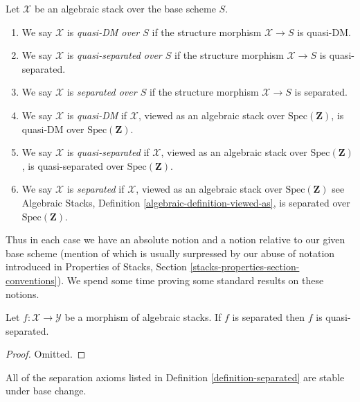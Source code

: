 \begin{definition}
\label{definition-absolute-separated}
Let $\mathcal{X}$ be an algebraic stack over the base scheme $S$.
\begin{enumerate}
\item We say $\mathcal{X}$ is {\it quasi-DM over $S$}
if the structure morphism $\mathcal{X} \to S$ is quasi-DM.
\item We say $\mathcal{X}$ is {\it quasi-separated over $S$} if
the structure morphism $\mathcal{X} \to S$ is quasi-separated.
\item We say $\mathcal{X}$ is {\it separated over $S$}
if the structure morphism $\mathcal{X} \to S$ is separated.
\item We say $\mathcal{X}$ is {\it quasi-DM}
if $\mathcal{X}$, viewed as an algebraic stack over $\text{Spec}(\mathbf{Z})$,
is quasi-DM over $\text{Spec}(\mathbf{Z})$.
\item We say $\mathcal{X}$ is {\it quasi-separated} if $\mathcal{X}$, viewed
as an algebraic stack over $\text{Spec}(\mathbf{Z})$, is quasi-separated over
$\text{Spec}(\mathbf{Z})$.
\item We say $\mathcal{X}$ is {\it separated} if $\mathcal{X}$, viewed
as an algebraic stack over $\text{Spec}(\mathbf{Z})$ see
Algebraic Stacks, Definition \ref{algebraic-definition-viewed-as},
is separated over $\text{Spec}(\mathbf{Z})$.
\end{enumerate}
\end{definition}

\noindent
Thus in each case we have an absolute notion and a notion relative to
our given base scheme (mention of which is usually surpressed by our
abuse of notation introduced in
Properties of Stacks, Section \ref{stacks-properties-section-conventions}).
We spend some time proving some standard results on these notions.

\begin{lemma}
\label{lemma-trivial-implications}
Let $f : \mathcal{X} \to \mathcal{Y}$ be a morphism of algebraic stacks.
If $f$ is separated then $f$ is quasi-separated.
\end{lemma}

\begin{proof}
Omitted.
\end{proof}

\begin{lemma}
\label{lemma-base-change-separated}
All of the separation axioms listed in
Definition \ref{definition-separated}
are stable under base change.
\end{lemma}

